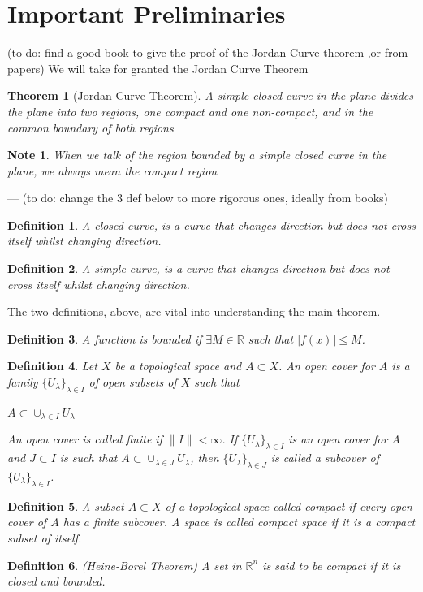 \documentclass[a4paper]{book}
\newtheorem{theorem}{Theorem}%
\newtheorem*{note*}{Note}%
\newtheorem{definition}{Definition}%
\begin{document}
\section*{Important Preliminaries}
(to do: find a good book to give the proof of the Jordan Curve theorem ,or from papers)
We will take for granted the Jordan Curve Theorem
\begin{theorem}[Jordan Curve Theorem]
    A simple closed curve in the plane divides the plane into two regions, one compact and one non-compact, and in the common boundary of both regions
\end{theorem}
\begin{note*}
    When we talk of the region bounded by a simple closed curve in the plane, we always mean the compact region
\end{note*}
---
(to do: change the 3 def below to more rigorous ones, ideally from books)
\begin{definition}
    A closed curve, is a curve that changes direction but does not cross itself whilst changing direction.
\end{definition}
\begin{definition}
    A simple curve, is a curve that changes direction but does not cross itself whilst changing direction.
\end{definition}
The two definitions, above, are vital into understanding the main theorem.
\begin{definition}
    A function is bounded if $\exists M \in \mathbb{R}$ such that $\left| f(x) \right| \leq M$.
\end{definition}
\begin{definition}
    Let $X$ be a topological space and $A \subset X$. An open cover for $A$ is a family $\{U_\lambda\}_{\lambda\in I}$ of open subsets of $X$ such that
    \begin{center}
        $A \subset \cup_{\lambda\in I}{U_\lambda}$
    \end{center}
    An open cover is called finite if $\|I\|<\infty$. If $\{U_\lambda\}_{\lambda\in I}$ is an open cover for $A$ and $J \subset I$ is such that $A\subset\cup_{\lambda\in J}{U_\lambda}$, then $\{U_\lambda\}_{\lambda\in J}$ is called a subcover of $\{U_\lambda\}_{\lambda\in I}$.
\end{definition}
\begin{definition}
    A subset $A \subset X$ of a topological space called compact if every open cover of $A$ has a finite subcover. A space is called compact space if it is a compact subset of itself.
\end{definition}
\begin{definition} (Heine-Borel Theorem)
    A set in $\mathbb{R}^n$ is said to be compact if it is closed and bounded.
\end{definition}
\end{document}
